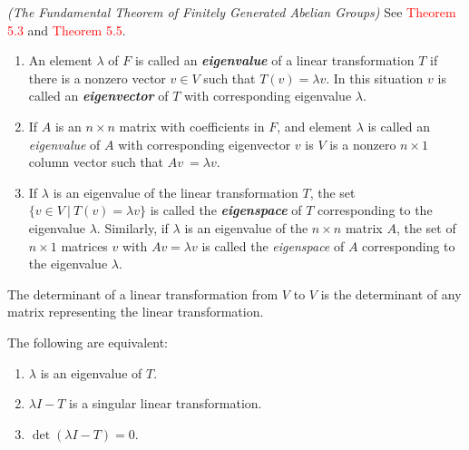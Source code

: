 \begin{cor}\textit{(The Fundamental Theorem of Finitely Generated Abelian Groups)}
See \textcolor{red}{Theorem 5.3} and \textcolor{red}{Theorem 5.5}.
\end{cor}

\nl

\begin{defn}\nl
\begin{enumerate}
\item An element $\lambda$ of $F$ is called an \textit{\textbf{eigenvalue}} of a linear transformation $T$ if there is a nonzero vector $v\in V$ such that $T(v) = \lambda v$. In this situation $v$ is called an \textit{\textbf{eigenvector}} of $T$ with corresponding eigenvalue $\lambda$.

\item If $A$ is an $n\times n$ matrix with coefficients in $F$, and element $\lambda$ is called an \textit{eigenvalue} of $A$ with corresponding eigenvector $v$ is $V$ is a nonzero $n\times 1$ column vector such that $Av\ = \lambda v$.

\item If $\lambda$ is an eigenvalue of the linear transformation $T$, the set $\{v\in V\ |\ T(v) = \lambda v\}$ is called the \textit{\textbf{eigenspace}} of $T$ corresponding to the eigenvalue $\lambda$. Similarly, if $\lambda$ is an eigenvalue of the $n\times n$ matrix $A$, the set of $n\times 1$ matrices $v$ with $Av = \lambda v$ is called the \textit{eigenspace} of $A$ corresponding to the eigenvalue $\lambda$.
\end{enumerate}
\end{defn}

\nl

\begin{defn}
The determinant of a linear transformation from $V$ to $V$ is the determinant of any matrix representing the linear transformation.
\end{defn}

\nl

\begin{prop}
The following are equivalent:
\begin{enumerate}
\item $\lambda$ is an eigenvalue of $T$.
\item $\lambda I - T$ is a singular linear transformation.
\item $\det(\lambda I - T) = 0$.
\end{enumerate}
\end{prop}

